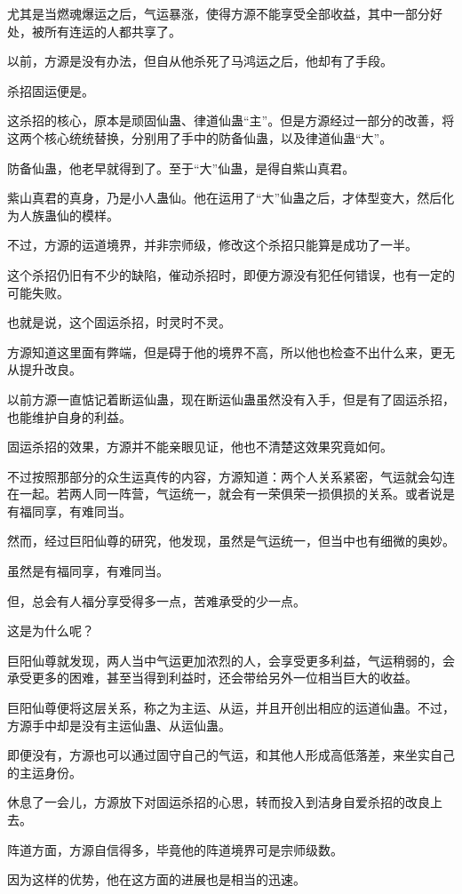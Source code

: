 \begin{this_body}
尤其是当燃魂爆运之后，气运暴涨，使得方源不能享受全部收益，其中一部分好处，被所有连运的人都共享了。

以前，方源是没有办法，但自从他杀死了马鸿运之后，他却有了手段。

杀招固运便是。

这杀招的核心，原本是顽固仙蛊、律道仙蛊“主”。但是方源经过一部分的改善，将这两个核心统统替换，分别用了手中的防备仙蛊，以及律道仙蛊“大”。

防备仙蛊，他老早就得到了。至于“大”仙蛊，是得自紫山真君。

紫山真君的真身，乃是小人蛊仙。他在运用了“大”仙蛊之后，才体型变大，然后化为人族蛊仙的模样。

不过，方源的运道境界，并非宗师级，修改这个杀招只能算是成功了一半。

这个杀招仍旧有不少的缺陷，催动杀招时，即便方源没有犯任何错误，也有一定的可能失败。

也就是说，这个固运杀招，时灵时不灵。

方源知道这里面有弊端，但是碍于他的境界不高，所以他也检查不出什么来，更无从提升改良。

以前方源一直惦记着断运仙蛊，现在断运仙蛊虽然没有入手，但是有了固运杀招，也能维护自身的利益。

固运杀招的效果，方源并不能亲眼见证，他也不清楚这效果究竟如何。

不过按照那部分的众生运真传的内容，方源知道：两个人关系紧密，气运就会勾连在一起。若两人同一阵营，气运统一，就会有一荣俱荣一损俱损的关系。或者说是有福同享，有难同当。

然而，经过巨阳仙尊的研究，他发现，虽然是气运统一，但当中也有细微的奥妙。

虽然是有福同享，有难同当。

但，总会有人福分享受得多一点，苦难承受的少一点。

这是为什么呢？

巨阳仙尊就发现，两人当中气运更加浓烈的人，会享受更多利益，气运稍弱的，会承受更多的困难，甚至当得到利益时，还会带给另外一位相当巨大的收益。

巨阳仙尊便将这层关系，称之为主运、从运，并且开创出相应的运道仙蛊。不过，方源手中却是没有主运仙蛊、从运仙蛊。

即便没有，方源也可以通过固守自己的气运，和其他人形成高低落差，来坐实自己的主运身份。

休息了一会儿，方源放下对固运杀招的心思，转而投入到洁身自爱杀招的改良上去。

阵道方面，方源自信得多，毕竟他的阵道境界可是宗师级数。

因为这样的优势，他在这方面的进展也是相当的迅速。


\end{this_body}

